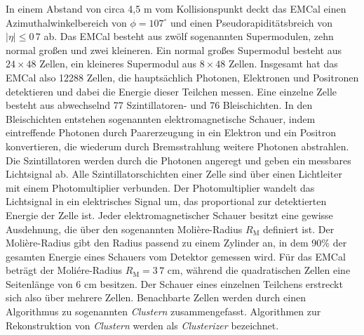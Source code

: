 In einem Abstand von circa 4,5 m vom Kollisionspunkt deckt das EMCal einen Azimuthalwinkelbereich von $\phi=107^{\circ}$ und einen Pseudorapiditätsbreich von $ |\eta| \leq 0\,7$ ab.
Das EMCal besteht aus zwölf sogenannten Supermodulen, zehn normal großen und zwei kleineren.
Ein normal großes Supermodul besteht aus $24\times48$ Zellen, ein kleineres Supermodul aus $8\times48$ Zellen.
Insgesamt hat das EMCal also 12288 Zellen, die hauptsächlich Photonen, Elektronen und Positronen detektieren und dabei die Energie dieser Teilchen messen.
Eine einzelne Zelle besteht aus abwechselnd 77 Szintillatoren- und 76 Bleischichten.
In den Bleischichten entstehen sogenannten elektromagnetische Schauer, indem eintreffende Photonen durch Paarerzeugung in ein Elektron und ein Positron konvertieren, die wiederum durch Bremsstrahlung weitere Photonen abstrahlen.
Die Szintillatoren werden durch die Photonen angeregt und geben ein messbares Lichtsignal ab.
Alle Szintillatorschichten einer Zelle sind über einen Lichtleiter mit einem Photomultiplier verbunden.
Der Photomultiplier wandelt das Lichtsignal in ein elektrisches Signal um, das proportional zur detektierten Energie der Zelle ist.
\newline
Jeder elektromagnetischer Schauer besitzt eine gewisse Ausdehnung, die über den sogenannten Moli\`ere-Radius $R_{\text{M}}$ definiert ist.
Der Moli\`ere-Radius gibt den Radius passend zu einem Zylinder an, in dem 90\% der gesamten Energie eines Schauers vom Detektor gemessen wird.
Für das EMCal beträgt der Moliére-Radius $R_{\text{M}} = 3\,7$ cm, während die quadratischen Zellen eine Seitenlänge von 6 cm besitzen. 
Der Schauer eines einzelnen Teilchens erstreckt sich also über mehrere Zellen.
Benachbarte Zellen werden durch einen Algorithmus zu sogenannten \textit{Clustern} zusammengefasst.
Algorithmen zur Rekonstruktion von \textit{Clustern} werden als \textit{Clusterizer} bezeichnet.
